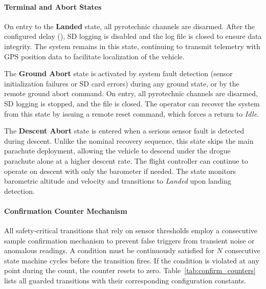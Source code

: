 \paragraph{Terminal and Abort States}

On entry to the \textbf{Landed} state, all pyrotechnic channels are disarmed. After the configured delay (), SD logging is disabled and the log file is closed to ensure data integrity. The system remains in this state, continuing to transmit telemetry with GPS position data to facilitate localization of the vehicle.

The \textbf{Ground Abort} state is activated by system fault detection (sensor initialization failures or SD card errors) during any ground state, or by the remote ground abort command. On entry, all pyrotechnic channels are disarmed, SD logging is stopped, and the file is closed. The operator can recover the system from this state by issuing a remote reset command, which forces a return to \emph{Idle}.

The \textbf{Descent Abort} state is entered when a serious sensor fault is detected during descent. Unlike the nominal recovery sequence, this state skips the main parachute deployment, allowing the vehicle to descend under the drogue parachute alone at a higher descent rate. The flight controller can continue to operate on descent with only the barometer if needed. The state monitors barometric altitude and velocity and transitions to \emph{Landed} upon landing detection.

\paragraph{Confirmation Counter Mechanism}

All safety-critical transitions that rely on sensor thresholds employ a consecutive sample confirmation mechanism to prevent false triggers from transient noise or anomalous readings. A condition must be continuously satisfied for $N$ consecutive state machine cycles before the transition fires. If the condition is violated at any point during the count, the counter resets to zero. Table~\ref{tab:confirm_counters} lists all guarded transitions with their corresponding configuration constants.

